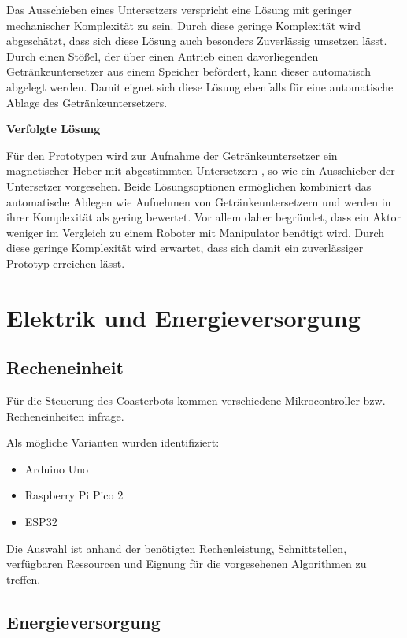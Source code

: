 \documentclass[
  a4paper,
  12pt,
  DIV=12,        %
  parskip=half,  %
  headings=small %
]{scrartcl}
\theoremstyle{definition}
\providecommand{\tightlist}{%
  \setlength{\itemsep}{0pt}\setlength{\parskip}{0pt}}
\theoremstyle{definition}
\begin{document}
Das Ausschieben eines Untersetzers verspricht eine Lösung mit geringer mechanischer Komplexität zu sein.
Durch diese geringe Komplexität wird abgeschätzt, dass sich diese Lösung auch besonders Zuverlässig umsetzen lässt.
Durch einen Stößel, der über einen Antrieb einen davorliegenden Getränkeuntersetzer aus einem Speicher
befördert, kann dieser automatisch abgelegt werden. Damit eignet sich diese Lösung ebenfalls für eine automatische
Ablage des Getränkeuntersetzers. 

\textbf{Verfolgte Lösung}

Für den Prototypen wird zur Aufnahme der Getränkeuntersetzer ein magnetischer Heber mit abgestimmten Untersetzern
, so wie ein Ausschieber der Untersetzer vorgesehen. Beide Lösungsoptionen ermöglichen kombiniert das automatische
Ablegen wie Aufnehmen von Getränkeuntersetzern und werden in ihrer Komplexität als gering bewertet. Vor allem daher
begründet, dass ein Aktor weniger im Vergleich zu einem Roboter mit Manipulator benötigt wird. Durch diese
geringe Komplexität wird erwartet, dass sich damit ein zuverlässiger Prototyp erreichen lässt. 


\section{Elektrik und
Energieversorgung}\label{elektrik-und-energieversorgung}

\subsection{Recheneinheit}\label{recheneinheit}

Für die Steuerung des Coasterbots kommen verschiedene Mikrocontroller
bzw. Recheneinheiten infrage.

Als mögliche Varianten wurden identifiziert:

\begin{itemize}
\tightlist
\item
  Arduino Uno
\item
  Raspberry Pi Pico 2
\item
  ESP32
\end{itemize}

Die Auswahl ist anhand der benötigten Rechenleistung, Schnittstellen,
verfügbaren Ressourcen und Eignung für die vorgesehenen Algorithmen zu
treffen.

\subsection{Energieversorgung}\label{energieversorgung}
\end{document}
